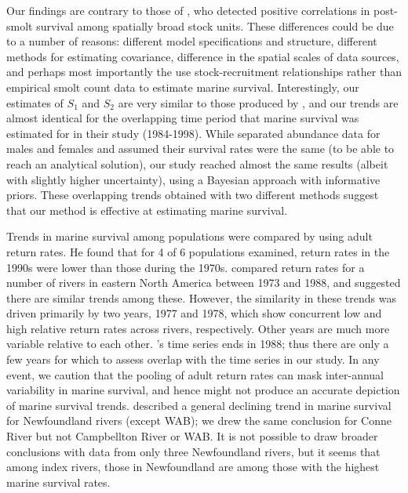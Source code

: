 \documentclass[12pt]{article}
\newcommand{\So}{$S_{1}$\xspace}
\newcommand{\St}{$S_{2}$\xspace}
\begin{document}
Our findings are contrary to those of \citet{Olmos2019}, who detected positive
correlations in post-smolt survival among spatially broad stock units. These differences
could be due to a number of reasons: different model specifications and
structure, different methods for estimating covariance, difference in the
spatial scales of data sources, and perhaps most importantly the use stock-recruitment relationships
rather than empirical smolt count data to estimate marine survival.
Interestingly, our estimates of \So and \St are very similar to those produced
by \citet{Chaput2003b}, and our trends are almost identical for the
overlapping time period that marine survival was estimated for in their study
(1984-1998). 
While \citet{Chaput2003b} separated abundance data for males and females
and assumed their survival rates were the same (to be able to reach an
analytical solution), our study reached almost the same results (albeit with
slightly higher uncertainty), using a Bayesian approach with informative
priors. These overlapping trends obtained with two different methods 
suggest that our method is effective at estimating marine survival.

Trends in marine survival
among populations were compared by \citet{Chaput2012a} using adult return rates.
He found that for 4 of 6 populations examined, return rates in the 1990s 
were lower than those during the 1970s.
\citet{Friedland1993} compared return rates for a number of rivers in eastern
North America between 1973 and 1988, and suggested there are similar trends among these. 
However, the similarity in these trends was driven primarily by two years, 1977 and 1978, which
show concurrent low and high relative return rates across rivers,
respectively. Other years are much more variable relative to each other.
\citeauthor{Friedland1993}'s \citeyear{Friedland1993} time series ends in  
1988; thus there are only a few years for which to assess overlap with the
time series in our study.
In any event, we caution that the pooling of adult return rates \citep{Chaput2012a, Friedland1993} 
can mask inter-annual variability in marine survival,
and hence might not produce an accurate depiction of marine survival trends.
\citet{Dempson2003} described a general declining trend in marine survival for
Newfoundland rivers (except WAB); we drew the same conclusion for 
Conne River but not Campbellton River or WAB. It is not possible to draw broader conclusions
with data from only three Newfoundland rivers, but it seems that among index rivers,
those in Newfoundland are among those with the highest marine survival rates.
\end{document}
